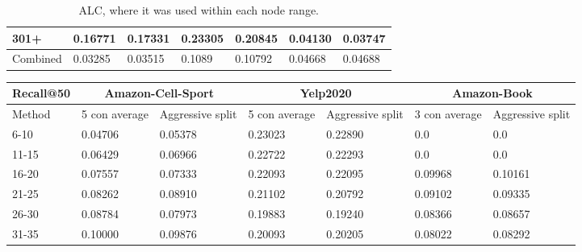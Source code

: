 \begin{table*}[h!]
\begin{tabular}{|l|l|l||l|l||l|l|}
        301+     & 0.16771                                 & 0.17331                        & 0.23305                          & 0.20845          & 0.04130       & 0.03747          \\ \hline
        Combined & 0.03285                                 & 0.03515                        & 0.1089                           & 0.10792          & 0.04668       & 0.04688          \\ \hline
    \end{tabular}
    \caption{ALC, where it was used within each node range.}
    \label{tab:ALC-degree-based-ndcg}
\end{table*}

\begin{table*}[h!]
    \centering
    \begin{tabular}{|l|l|l||l|l||l|l|}
        \hline
        Recall@50 & \multicolumn{2}{c||}{Amazon-Cell-Sport} & \multicolumn{2}{c||}{Yelp2020} & \multicolumn{2}{c|}{Amazon-Book}                                                       \\ \hline
        Method    & 5 con average                           & Aggressive split               & 5 con average                    & Aggressive split & 3 con average & Aggressive split \\ \hline
        6-10      & 0.04706                                 & 0.05378                        & 0.23023                          & 0.22890          & 0.0           & 0.0              \\ \hline
        11-15     & 0.06429                                 & 0.06966                        & 0.22722                          & 0.22293          & 0.0           & 0.0              \\ \hline
        16-20     & 0.07557                                 & 0.07333                        & 0.22093                          & 0.22095          & 0.09968       & 0.10161          \\ \hline
        21-25     & 0.08262                                 & 0.08910                        & 0.21102                          & 0.20792          & 0.09102       & 0.09335          \\ \hline
        26-30     & 0.08784                                 & 0.07973                        & 0.19883                          & 0.19240          & 0.08366       & 0.08657          \\ \hline
        31-35     & 0.10000                                 & 0.09876                        & 0.20093                          & 0.20205          & 0.08022       & 0.08292          \\ \hline

\end{tabular}
\end{table*}
